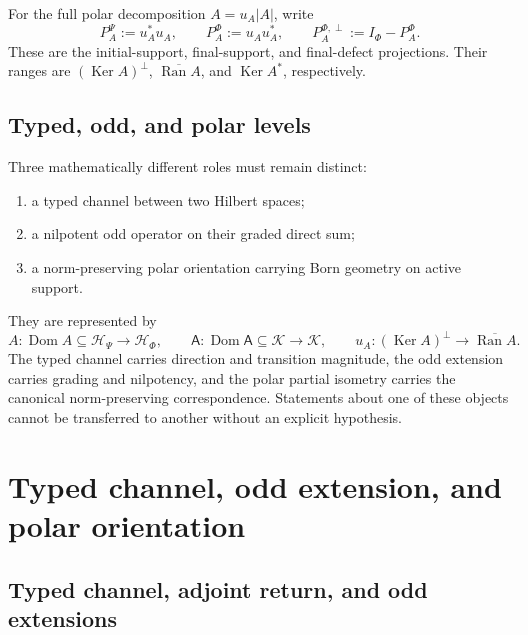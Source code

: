 \documentclass[11pt,reqno]{scrartcl}
\newcommand{\scrK}{\mathscr K}
\newcommand{\scrHP}{\mathscr H_{\Psi}}
\newcommand{\scrHF}{\mathscr H_{\Phi}}
\newcommand{\Aodd}{\mathsf A}
\DeclareMathOperator{\Dom}{Dom}
\DeclareMathOperator{\Ran}{Ran}
\DeclareMathOperator{\Ker}{Ker}
\newcommand{\suppProjP}{P_{A}^{\Psi}}
\newcommand{\suppProjF}{P_{A}^{\Phi}}
\newcommand{\defectProjF}{P_{A}^{\Phi,\perp}}
\theoremstyle{plain}
\theoremstyle{definition}
\theoremstyle{remark}
\begin{document}
For the full polar decomposition \(A=u_A|A|\), write
\begin{equation}
  \suppProjP:=u_A^*u_A,
  \qquad
  \suppProjF:=u_Au_A^*,
  \qquad
  \defectProjF:=I_{\Phi}-\suppProjF.
  \label{eq:support-notation-charter}
\end{equation}
These are the initial-support, final-support, and final-defect projections.
Their ranges are \((\Ker A)^\perp\), \(\overline{\Ran A}\), and
\(\Ker A^*\), respectively.

\subsection{Typed, odd, and polar levels}

Three mathematically different roles must remain distinct:
\begin{enumerate}[label=(\roman*)]
  \item a typed channel between two Hilbert spaces;
  \item a nilpotent odd operator on their graded direct sum;
  \item a norm-preserving polar orientation carrying Born geometry on active
  support.
\end{enumerate}
They are represented by
\begin{equation}
  \boxed{
  A:\Dom A\subseteq\scrHP\to\scrHF,
  \qquad
  \Aodd:\Dom\Aodd\subseteq\scrK\to\scrK,
  \qquad
  u_A:(\Ker A)^\perp\to\overline{\Ran A}.}
  \label{eq:three-A-levels}
\end{equation}
The typed channel carries direction and transition magnitude, the odd
extension carries grading and nilpotency, and the polar partial isometry
carries the canonical norm-preserving correspondence.  Statements about one
of these objects cannot be transferred to another without an explicit
hypothesis.
\section{Typed channel, odd extension, and polar orientation}
\label{sec:typed-repair}

\subsection{Typed channel, adjoint return, and odd extensions}
\end{document}

